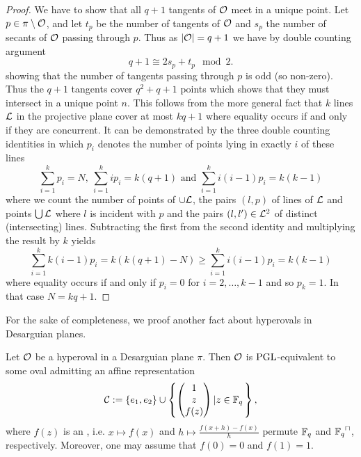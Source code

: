 \begin{proof}
    We have to show that all $q+1$ tangents of $\mathcal{O}$ meet in a unique point. Let $p\in\pi\setminus\mathcal{O}$, and let $t_p$ be the number of tangents of $\mathcal{O}$ and $s_p$ the number of secants of $\mathcal{O}$ passing through $p$. Thus as $\left|\mathcal{O}\right|=q+1$ we have by double counting argument
    $$
    q+1 \cong 2s_p+t_p \mod 2.
    $$
    showing that the number of tangents passing through $p$ is odd (so non-zero). Thus the $q+1$ tangents cover $q^2+q+1$ points which shows that they must intersect in a unique point $n$. This follows from the more general fact that $k$ lines $\mathcal{L}$ in the projective plane cover at most $kq+1$ where equality occurs if and only if they are concurrent. It can be demonstrated by the three double counting identities in which $p_i$ denotes the number of points lying in exactly $i$ of these lines
    $$
    \sum_{i=1}^k{p_i}=N,\
    \sum_{i=1}^k{ip_i}=k(q+1)\textrm{ and }\sum_{i=1}^k{i(i-1)p_i}=k(k-1)
    $$
    where we count the number of points of $\cup\mathcal{L}$, the pairs $(l,p)$ of lines of $\mathcal{L}$ and points $\bigcup\mathcal{L}$ where $l$ is incident with $p$ and the pairs $(l,l')\in\mathcal{L}^2$ of distinct (intersecting) lines.
    Subtracting the first from the second identity and multiplying the result by $k$ yields
    $$
    \sum_{i=1}^k{k(i-1)p_i}=k(k(q+1)-N)\geq \sum_{i=1}^k{i(i-1)p_i}=k(k-1)
    $$
    where equality occurs if and only if $p_i=0$ for $i=2,\ldots,k-1$ and so $p_k=1$. In that case $N=kq+1$.
\end{proof}%

For the sake of completeness, we proof another fact about hyperovals in Desarguian planes.

\begin{lemma}
    Let $\mathcal{O}$ be a hyperoval in a Desarguian plane $\pi$. Then $\mathcal{O}$ is $\mathrm{PGL}$-equivalent to some oval admitting an affine representation
    $$
    \cC:=\set{e_1,e_2}\setjoin\set{\begin{pmatrix} 1\\ z\\ f(z)\end{pmatrix}}[z\in\field{q}],
    $$
    where $f(z)$ is an , i.e. $x\mapsto f(x)$ and $h\mapsto\frac{f(x+h)-f(x)}{h}$ permute $\mathbb{F}_{q}$ and $\units{\field{q}}$, respectively.
    Moreover, one may assume that $f(0)=0$ and $f(1)=1$.
\end{lemma}


